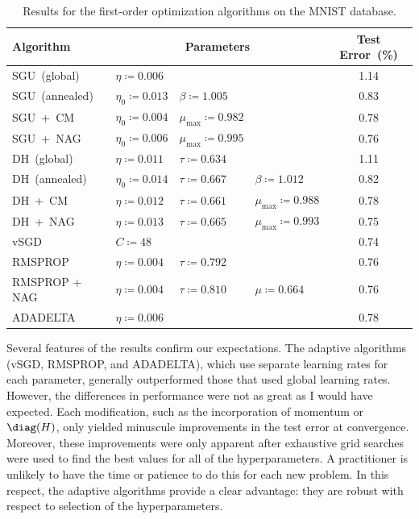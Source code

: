 \documentclass[11pt,a4paper]{article}
\numberwithin{equation}{section}
\begin{document}
\begin{table}
\centering
\begin{tabular}{llllc}
\toprule
Algorithm & \multicolumn{3}{c}{Parameters} & Test Error~(\%) \\
\midrule
SGU~(global) & $\eta \coloneqq 0.006$ & & & 1.14 \\
SGU~(annealed) & $\eta_0 \coloneqq 0.013$ & $\beta \coloneqq 1.005$ & & 0.83 \\
SGU~+~CM & $\eta_0 \coloneqq 0.004$ & $\mu_{\text{max}} \coloneqq 0.982$ & & 0.78 \\
SGU~+~NAG & $\eta_0 \coloneqq 0.006$ & $\mu_{\text{max}} \coloneqq 0.995$ & & 0.76 \\
DH~(global) & $\eta \coloneqq 0.011$ & $\tau \coloneqq 0.634$ & & 1.11 \\
DH~(annealed) & $\eta_0 \coloneqq 0.014$ & $\tau \coloneqq 0.667$ & $\beta \coloneqq 1.012$ & 0.82 \\
DH~+~CM & $\eta \coloneqq 0.012$ & $\tau \coloneqq 0.661$ & $\mu_{\text{max}} \coloneqq 0.988$ & 0.78 \\
DH~+~NAG & $\eta \coloneqq 0.013$ & $\tau \coloneqq 0.665$ & $\mu_{\text{max}} \coloneqq 0.993$ & 0.75 \\
vSGD & $C \coloneqq 48$ & & & 0.74 \\
RMSPROP & $\eta \coloneqq 0.004$ & $\tau \coloneqq 0.792$ & & 0.76 \\
RMSPROP + NAG & $\eta \coloneqq 0.004$ & $\tau \coloneqq 0.810$ & $\mu \coloneqq 0.664$ & 0.76 \\
ADADELTA & $\eta \coloneqq 0.006$ & & & 0.78 \\
\bottomrule
\end{tabular}
\caption{Results for the first-order optimization algorithms on the MNIST
database.\label{tab:first_order_results}}
\end{table}

Several features of the results confirm our expectations. The adaptive
algorithms (vSGD, RMSPROP, and ADADELTA), which use separate learning rates for
each parameter, generally outperformed those that used global learning rates.
However, the differences in performance were not as great as I would have
expected. Each modification, such as the incorporation of momentum
or~$\diag(H)$, only yielded minuscule improvements in the test error at
convergence. Moreover, these improvements were only apparent after exhaustive
grid searches were used to find the best values for all of the hyperparameters. A
practitioner is unlikely to have the time or patience to do this for each new
problem. In this respect, the adaptive algorithms provide a clear advantage:
they are robust with respect to selection of the hyperparameters.
\end{document}
